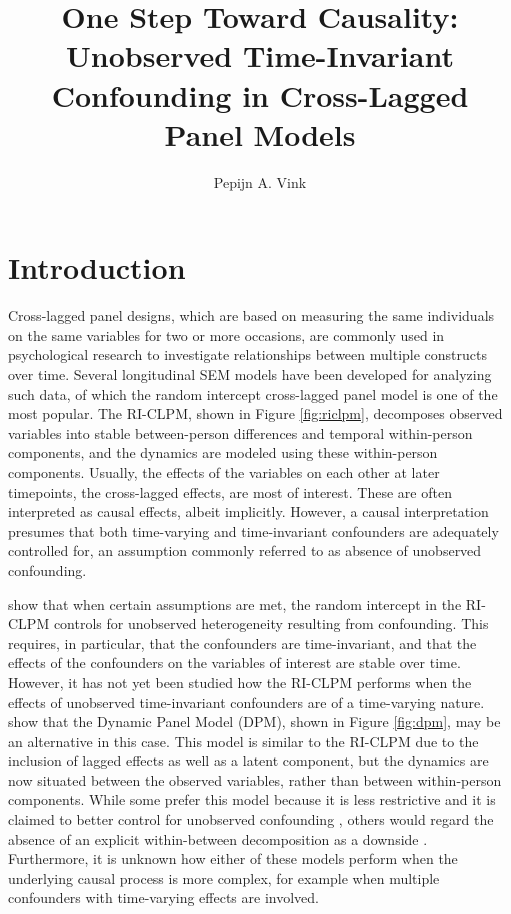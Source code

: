 \documentclass[
  a4paper,
  stu,
  floatsintext,
  donotrepeattitle]{apa7}
\affiliation{{Utrecht University}}
\title{One Step Toward Causality: Unobserved Time-Invariant Confounding
in Cross-Lagged Panel Models}
\author{Pepijn A. Vink}
\date{}
\begin{document}
\maketitle
\ifdefined\Shaded\renewenvironment{Shaded}{\begin{tcolorbox}[borderline west={3pt}{0pt}{shadecolor}, boxrule=0pt, breakable, sharp corners, frame hidden, enhanced, interior hidden]}{\end{tcolorbox}}\fi

\newcommand{\indep}{\perp \!\!\! \perp}

\hypertarget{introduction}{%
\section{Introduction}\label{introduction}}

Cross-lagged panel designs, which are based on measuring the same
individuals on the same variables for two or more occasions, are
commonly used in psychological research to investigate relationships
between multiple constructs over time. Several longitudinal SEM models
have been developed for analyzing such data, of which the random
intercept cross-lagged panel model
\autocites[RI-CLPM,][]{hamaker2015,mulder2021} is one of the most
popular. The RI-CLPM, shown in Figure \ref{fig:riclpm}, decomposes
observed variables into stable between-person differences and temporal
within-person components, and the dynamics are modeled using these
within-person components. Usually, the effects of the variables on each
other at later timepoints, the cross-lagged effects, are most of
interest. These are often interpreted as causal effects, albeit
implicitly. However, a causal interpretation presumes that both
time-varying and time-invariant confounders are adequately controlled
for, an assumption commonly referred to as absence of unobserved
confounding.

\textcite{usami2019} show that when certain assumptions are met, the
random intercept in the RI-CLPM controls for unobserved heterogeneity
resulting from confounding. This requires, in particular, that the
confounders are time-invariant, and that the effects of the confounders
on the variables of interest are stable over time. However, it has not
yet been studied how the RI-CLPM performs when the effects of unobserved
time-invariant confounders are of a time-varying nature.
\textcite{murayama2022} show that the Dynamic Panel Model (DPM), shown
in Figure \ref{fig:dpm}, may be an alternative in this case. This model
is similar to the RI-CLPM due to the inclusion of lagged effects as well
as a latent component, but the dynamics are now situated between the
observed variables, rather than between within-person components. While
some prefer this model because it is less restrictive and it is claimed
to better control for unobserved confounding \autocite{allison2017},
others would regard the absence of an explicit within-between
decomposition as a downside \autocite[e.g.][]{hoffman2024}. Furthermore,
it is unknown how either of these models perform when the underlying
causal process is more complex, for example when multiple confounders
with time-varying effects are involved.
\end{document}
